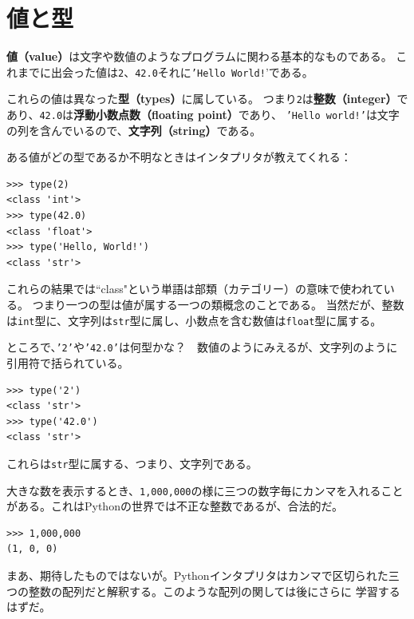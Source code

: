 \documentclass[a4j,12pt,makeidx]{jbook}
\begin{document}
\section{値と型}
{\bf 値（value）}は文字や数値のようなプログラムに関わる基本的なものである。
これまでに出会った値は{\tt 2}、{\tt 42.0}それに{\tt 'Hello World!}'である。\par
これらの値は異なった{\bf 型（types）}に属している。
つまり{\tt 2}は{\bf 整数（integer）}であり、{\tt 42.0}は{\bf 浮動小数点数（floating point）}であり、
{\tt 'Hello world!'}は文字の列を含んでいるので、{\bf 文字列（string）}である。\par
{}
ある値がどの型であるか不明なときはインタプリタが教えてくれる：
\begin{verbatim}
>>> type(2)
<class 'int'>
>>> type(42.0)
<class 'float'>
>>> type('Hello, World!')
<class 'str'>
\end{verbatim}
%
これらの結果では``class"という単語は部類（カテゴリー）の意味で使われている。
つまり一つの型は値が属する一つの類概念のことである。
当然だが、整数は{\tt int}型に、文字列は{\tt str}型に属し、小数点を含む数値は{\tt float}型に属する。\par
{}
ところで、{\tt '2'}や{\tt '42.0'}は何型かな？　数値のようにみえるが、文字列のように引用符で括られている。
\begin{verbatim}
>>> type('2')
<class 'str'>
>>> type('42.0')
<class 'str'>
\end{verbatim}
%
これらは{\tt str}型に属する、つまり、文字列である。\par
{}
大きな数を表示するとき、{\tt 1,000,000}の様に三つの数字毎にカンマを入れることがある。これはPythonの世界では不正な整数であるが、合法的だ。
\begin{verbatim}
>>> 1,000,000
(1, 0, 0)
\end{verbatim}
まあ、期待したものではないが。Pythonインタプリタはカンマで区切られた三つの整数の配列だと解釈する。このような配列の関しては後にさらに
学習するはずだ。
%
\end{document}
